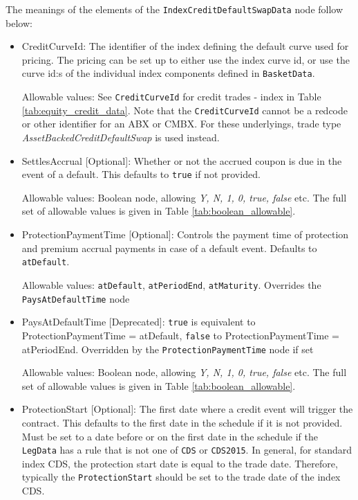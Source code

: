 The meanings of the elements of the {\tt IndexCreditDefaultSwapData}  node follow below:

\begin{itemize}
\item CreditCurveId: The identifier of the index defining the default curve used for pricing. The pricing can be set up to either use the index curve id, or use the curve id:s of the individual index components defined in {\tt BasketData}.

Allowable values: See \lstinline!CreditCurveId! for credit trades - index in Table \ref{tab:equity_credit_data}. Note that the \lstinline!CreditCurveId! cannot be a redcode or other identifier for an ABX or CMBX. For these underlyings, trade type \emph{AssetBackedCreditDefaultSwap} is used instead. \\

\item SettlesAccrual [Optional]: Whether or not the accrued coupon is due in the event of a default. This defaults to \lstinline!true! if not provided.

Allowable values: Boolean node, allowing \emph{Y, N, 1, 0, true, false} etc. The full set of allowable values is given in Table \ref{tab:boolean_allowable}.

\item ProtectionPaymentTime [Optional]: Controls the payment time of protection and premium accrual payments in case of
  a default event. Defaults to \lstinline!atDefault!. 
  
  Allowable values: \lstinline!atDefault!, \lstinline!atPeriodEnd!, \lstinline!atMaturity!. Overrides the \lstinline!PaysAtDefaultTime! node

\item PaysAtDefaultTime [Deprecated]: \lstinline!true! is equivalent to ProtectionPaymentTime = atDefault,
  \lstinline!false! to ProtectionPaymentTime = atPeriodEnd. Overridden by the \lstinline!ProtectionPaymentTime! node if set
  
Allowable values: Boolean node, allowing \emph{Y, N, 1, 0, true, false} etc. The full set of allowable values is given in Table \ref{tab:boolean_allowable}.

\item ProtectionStart [Optional]: The first date where a credit event will trigger the contract. This defaults to the first date in the schedule if it is not provided. Must be set to a date before or on the first date in the schedule if the \lstinline!LegData! has a rule that is not one of \lstinline!CDS! or \lstinline!CDS2015!. In general, for standard index CDS, the protection start date is equal to the trade date. Therefore, typically the \lstinline!ProtectionStart! should be set to the trade date of the index CDS.


\end{itemize}

